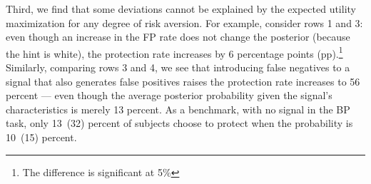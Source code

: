 \documentclass[12pt,a4paper]{article}
\begin{document}
Third, we find that some deviations cannot be explained by the expected utility maximization for any degree of risk aversion. For example, consider rows 1 and 3: even though an increase in the FP rate does not change the posterior (because the hint is white), the protection rate increases by 6 percentage points (pp).\footnote{The difference is significant at 5\%} Similarly, comparing rows 3 and 4, we see that introducing false negatives to a signal that also generates false positives raises the protection rate increases to 56 percent --- even though the average posterior probability given the signal's characteristics is merely 13 percent. As a benchmark, with no signal in the BP task, only 13~(32) percent of subjects choose to protect when the probability is 10~(15) percent. 


\begin{table}[H]\centering 
\caption{Average Protection by Signal Type} 
\label{tab:nonparIP}
\end{table}
\end{document}

